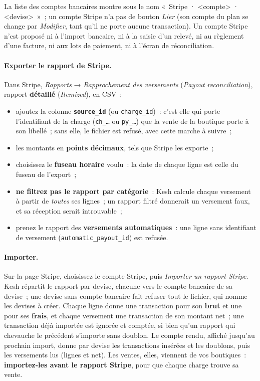 \documentclass[a4paper,11pt,oneside]{article}
\begin{document}
La liste des comptes bancaires montre sous le nom «~Stripe · <compte> · <devise>~»~; un compte Stripe n'a pas de bouton \emph{Lier} (son compte du plan se change par \emph{Modifier}, tant qu'il ne porte aucune transaction). Un compte Stripe n'est proposé ni à l'import bancaire, ni à la saisie d'un relevé, ni au règlement d'une facture, ni aux lots de paiement, ni à l'écran de réconciliation.

\paragraph{Exporter le rapport de Stripe.} Dans Stripe, \emph{Rapports} → \emph{Rapprochement des versements} (\emph{Payout reconciliation}), rapport \textbf{détaillé} (\emph{Itemized}), en CSV~:
\begin{itemize}
    \item ajoutez la colonne \textbf{\texttt{source\_id}} (ou \texttt{charge\_id})~: c'est elle qui porte l'identifiant de la charge (\texttt{ch\_\dots} ou \texttt{py\_\dots}) que la vente de la boutique porte à son libellé~; sans elle, le fichier est refusé, avec cette marche à suivre~;
    \item les montants en \textbf{points décimaux}, tels que Stripe les exporte~;
    \item choisissez le \textbf{fuseau horaire} voulu~: la date de chaque ligne est celle du fuseau de l'export~;
    \item \textbf{ne filtrez pas le rapport par catégorie}~: Kesh calcule chaque versement à partir de \emph{toutes} ses lignes~; un rapport filtré donnerait un versement faux, et sa réception serait introuvable~;
    \item prenez le rapport des \textbf{versements automatiques}~: une ligne sans identifiant de versement (\texttt{automatic\_payout\_id}) est refusée.
\end{itemize}

\paragraph{Importer.} Sur la page Stripe, choisissez le compte Stripe, puis \emph{Importer un rapport Stripe}. Kesh répartit le rapport par devise, chacune vers le compte bancaire de sa devise~; une devise sans compte bancaire fait refuser tout le fichier, qui nomme les devises à créer. Chaque ligne donne une transaction pour son \textbf{brut} et une pour ses \textbf{frais}, et chaque versement une transaction de son montant net~; une transaction déjà importée est ignorée et comptée, si bien qu'un rapport qui chevauche le précédent s'importe sans doublon. Le compte rendu, affiché jusqu'au prochain import, donne par devise les transactions insérées et les doublons, puis les versements lus (lignes et net). Les ventes, elles, viennent de vos boutiques~: \textbf{importez-les avant le rapport Stripe}, pour que chaque charge trouve sa vente.
\end{document}
